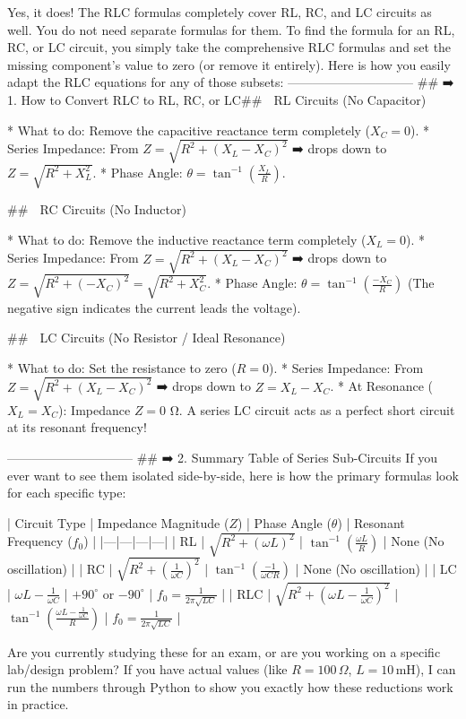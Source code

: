 Yes, it does! The RLC formulas completely cover RL, RC, and LC circuits as well.
You do not need separate formulas for them. To find the formula for an RL, RC, or LC circuit, you simply take the comprehensive RLC formulas and set the missing component's value to zero (or remove it entirely).
Here is how you easily adapt the RLC equations for any of those subsets:
------------------------------
## ➡️ 1. How to Convert RLC to RL, RC, or LC## 📌 RL Circuits (No Capacitor)

* What to do: Remove the capacitive reactance term completely ($X_C = 0$).
* Series Impedance: From $Z = \sqrt{R^2 + (X_L - X_C)^2}$ ➡️ drops down to $Z = \sqrt{R^2 + X_L^2}$.
* Phase Angle: $\theta = \tan^{-1}\left(\frac{X_L}{R}\right)$.

## 📌 RC Circuits (No Inductor)

* What to do: Remove the inductive reactance term completely ($X_L = 0$).
* Series Impedance: From $Z = \sqrt{R^2 + (X_L - X_C)^2}$ ➡️ drops down to $Z = \sqrt{R^2 + (-X_C)^2} = \sqrt{R^2 + X_C^2}$.
* Phase Angle: $\theta = \tan^{-1}\left(\frac{-X_C}{R}\right)$ (The negative sign indicates the current leads the voltage).

## 📌 LC Circuits (No Resistor / Ideal Resonance)

* What to do: Set the resistance to zero ($R = 0$).
* Series Impedance: From $Z = \sqrt{R^2 + (X_L - X_C)^2}$ ➡️ drops down to $Z = X_L - X_C$.
* At Resonance ($X_L = X_C$): Impedance $Z = 0$ Ω. A series LC circuit acts as a perfect short circuit at its resonant frequency!

------------------------------
## ➡️ 2. Summary Table of Series Sub-Circuits
If you ever want to see them isolated side-by-side, here is how the primary formulas look for each specific type:

| Circuit Type | Impedance Magnitude ($Z$) | Phase Angle ($\theta$) | Resonant Frequency ($f_0$) |
|---|---|---|---|
| RL | $\sqrt{R^2 + (\omega L)^2}$ | $\tan^{-1}\left(\frac{\omega L}{R}\right)$ | None (No oscillation) |
| RC | $\sqrt{R^2 + \left(\frac{1}{\omega C}\right)^2}$ | $\tan^{-1}\left(\frac{-1}{\omega C R}\right)$ | None (No oscillation) |
| LC | $\omega L - \frac{1}{\omega C}$ | $+90^\circ$ or $-90^\circ$ | $f_0 = \frac{1}{2\pi\sqrt{LC}}$ |
| RLC | $\sqrt{R^2 + \left(\omega L - \frac{1}{\omega C}\right)^2}$ | $\tan^{-1}\left(\frac{\omega L - \frac{1}{\omega C}}{R}\right)$ | $f_0 = \frac{1}{2\pi\sqrt{LC}}$ |

Are you currently studying these for an exam, or are you working on a specific lab/design problem? If you have actual values (like $R = 100\,\Omega$, $L = 10\,\text{mH}$), I can run the numbers through Python to show you exactly how these reductions work in practice.

